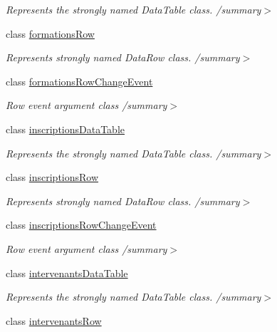 \begin{DoxyCompactItemize}
\begin{DoxyCompactList}\small\item\em Represents the strongly named Data\+Table class. /summary$>$ \end{DoxyCompactList}\item 
class \hyperlink{classforma_1_1formadb_data_set_1_1formations_row}{formations\+Row}
\begin{DoxyCompactList}\small\item\em Represents strongly named Data\+Row class. /summary$>$ \end{DoxyCompactList}\item 
class \hyperlink{classforma_1_1formadb_data_set_1_1formations_row_change_event}{formations\+Row\+Change\+Event}
\begin{DoxyCompactList}\small\item\em Row event argument class /summary$>$ \end{DoxyCompactList}\item 
class \hyperlink{classforma_1_1formadb_data_set_1_1inscriptions_data_table}{inscriptions\+Data\+Table}
\begin{DoxyCompactList}\small\item\em Represents the strongly named Data\+Table class. /summary$>$ \end{DoxyCompactList}\item 
class \hyperlink{classforma_1_1formadb_data_set_1_1inscriptions_row}{inscriptions\+Row}
\begin{DoxyCompactList}\small\item\em Represents strongly named Data\+Row class. /summary$>$ \end{DoxyCompactList}\item 
class \hyperlink{classforma_1_1formadb_data_set_1_1inscriptions_row_change_event}{inscriptions\+Row\+Change\+Event}
\begin{DoxyCompactList}\small\item\em Row event argument class /summary$>$ \end{DoxyCompactList}\item 
class \hyperlink{classforma_1_1formadb_data_set_1_1intervenants_data_table}{intervenants\+Data\+Table}
\begin{DoxyCompactList}\small\item\em Represents the strongly named Data\+Table class. /summary$>$ \end{DoxyCompactList}\item 
class \hyperlink{classforma_1_1formadb_data_set_1_1intervenants_row}{intervenants\+Row}

\end{DoxyCompactItemize}
